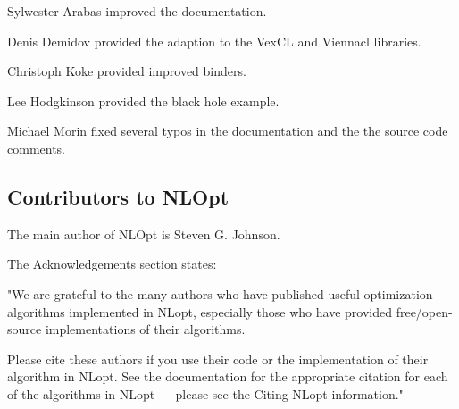 Sylwester Arabas improved the documentation. 

Denis Demidov provided the adaption to the VexCL and Viennacl libraries. 

Christoph Koke provided improved binders. 

Lee Hodgkinson provided the black hole example. 

Michael Morin fixed several typos in the documentation and the the source code comments. 

  





\subsection{Contributors to NLOpt}
\label{Contributors to NLOpt}
The main author of NLOpt is Steven G. Johnson.

\vpara
The Acknowledgements section states:

\vpara
"We are grateful to the many authors who have published useful optimization algorithms implemented in NLopt, especially those who have provided free/open-source implementations of their algorithms. 

\vpara
Please cite these authors if you use their code or the implementation of their algorithm in NLopt. See the documentation for the appropriate citation for each of the algorithms in NLopt — please see the Citing NLopt information."








